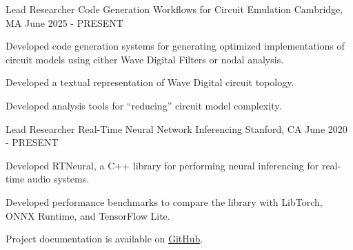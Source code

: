
\begin{cventries}

  \cventry
    {Lead Researcher} %
    {Code Generation Workflows for Circuit Emulation} %
    {Cambridge, MA} %
    {June 2025 - PRESENT} %
    {
      \begin{cvitems} %
        \item {Developed code generation systems for generating optimized implementations of circuit models using either Wave Digital Filters or nodal analysis.}
        \item {Developed a textual representation of Wave Digital circuit topology.}
        \item {Developed analysis tools for ``reducing'' circuit model complexity.}
      \end{cvitems}
    }

  \cventry
    {Lead Researcher} %
    {Real-Time Neural Network Inferencing} %
    {Stanford, CA} %
    {June 2020 - PRESENT} %
    {
      \begin{cvitems} %
        \item {Developed RTNeural, a C++ library for performing neural inferencing for real-time audio systems.}
        \item {Developed performance benchmarks to compare the library with LibTorch, ONNX Runtime, and TensorFlow Lite.}
        \item {Project documentation is available on \href{https://github.com/jatinchowdhury18/RTNeural}{GitHub}.}
      \end{cvitems}
    }


\end{cventries}
